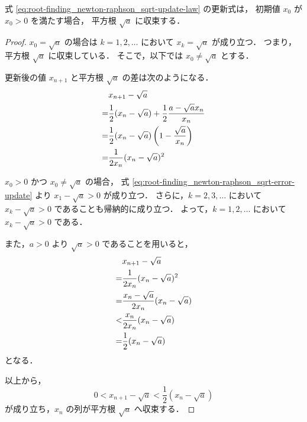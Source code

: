 \begin{theorem}
    式 \eqref{eq:root-finding_newton-raphson_sqrt-update-law} の更新式は，
    初期値 $x_0$ が $x_0 > 0$ を満たす場合，
    平方根 $\sqrt{a}$ に収束する．
\end{theorem}
\begin{proof}
    $x_0 = \sqrt{a}$ の場合は
    $k = 1, 2, \ldots$ において $x_k = \sqrt{a}$ が成り立つ．
    つまり，平方根 $\sqrt{a}$ に収束している．
    そこで，以下では $x_0 \neq \sqrt{a}$ とする．

    更新後の値 $x_{n+1}$ と平方根 $\sqrt{a}$ の差は次のようになる．
    \begin{align}
          & x_{n+1} - \sqrt{a}                                                      \notag \\
        = & \frac{1}{2} (x_n - \sqrt{a}) + \frac{1}{2} \frac{a - \sqrt{a} x_n}{x_n} \notag \\
        = & \frac{1}{2} (x_n - \sqrt{a}) \left(1 - \frac{\sqrt{a}}{x_n}\right)      \notag \\
        = & \frac{1}{2x_n} (x_n - \sqrt{a})^2
        \label{eq:root-finding_newton-raphson_sqrt-error-update}
    \end{align}

    $x_0 > 0$ かつ $x_0 \neq \sqrt{a}$ の場合，
    式 \eqref{eq:root-finding_newton-raphson_sqrt-error-update} より
    $x_1 - \sqrt{a} > 0$ が成り立つ．
    さらに，$k = 2, 3, \ldots$ において $x_k - \sqrt{a} > 0$ であることも帰納的に成り立つ．
    よって，$k = 1, 2, \ldots$ において $x_k - \sqrt{a} > 0$ である．

    また，$a > 0$ より $\sqrt{a} > 0$ であることを用いると，
    \begin{align}
          & x_{n+1} - \sqrt{a}                           \notag \\
        = & \frac{1}{2x_n} (x_n - \sqrt{a})^2            \notag \\
        = & \frac{x_n - \sqrt{a}}{2x_n} (x_n - \sqrt{a}) \notag \\
        < & \frac{x_n}{2x_n} (x_n - \sqrt{a})            \notag \\
        = & \frac{1}{2} (x_n - \sqrt{a})
    \end{align}
    となる．

    以上から，
    \begin{equation}
        0 < x_{n+1} - \sqrt{a} < \frac{1}{2} (x_n - \sqrt{a})
    \end{equation}
    が成り立ち，$x_n$ の列が平方根 $\sqrt{a}$ へ収束する．
\end{proof}

